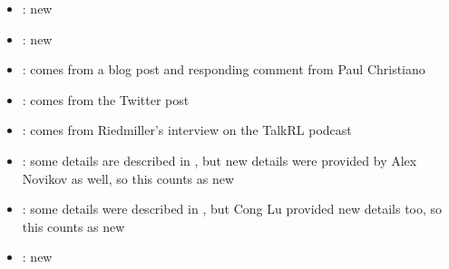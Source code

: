 \begin{itemize}
    \item {}: new
    \item {}: new
    \item {}: comes from a blog post and responding comment from Paul Christiano~\citep{christianoweddingparties}
    \item {}: comes from the Twitter post~\citep{claude3tweet}
    \item {}: comes from Riedmiller's interview on the TalkRL podcast~\citep{TalkRL_Riedmiller_2023}
    \item {}: some details are described in \citet{RomeraParedes2023}, but new details were provided by Alex Novikov as well, so this counts as new
    \item {}: some details were described in \citet{sakana2024aiscientist_blog}, but Cong Lu provided new details too, so this counts as new
    \item {}: new
\end{itemize}


\clearpage



